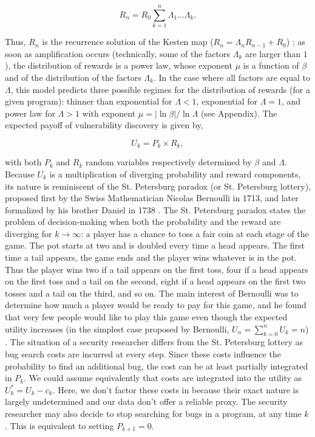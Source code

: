 \begin{equation}
R_{n} = R_{0} \sum_{k=1}^{n} \Lambda_1 ... \Lambda_k.
\end{equation}

Thus, $R_{n}$ is the recurrence solution of the  
Kesten map ($R_{n} = \Lambda_n R_{n-1} +R_0$)
\cite{kesten1973random,sornette1997convergent}:  as soon as amplification occurs (technically, 
some of the factors $\Lambda_k$ are larger than $1$), the distribution
of rewards is a power law, whose exponent $\mu$ is a function of $\beta$
and of the distribution of the factors $\Lambda_k$. In the case where
all factors are equal to $\Lambda$, this model predicts three possible regimes for the distribution of rewards (for a given program): thinner than exponential for $\Lambda < 1$, exponential for $\Lambda = 1$, and power law for $\Lambda > 1$ with exponent $\mu = |\ln \beta|/ \ln \Lambda$ (see Appendix). The expected payoff of vulnerability discovery is given by,

\begin{equation}
\label{ }
U_k = P_k \times R_k,
\end{equation}

\noindent with both $P_k$ and $R_k$ random variables respectively determined by $\beta$ and $\Lambda$. Because $U_k$ is a multiplication of diverging probability and reward components, its nature is reminiscent of the St. Petersburg paradox (or St. Petersburg lottery), proposed first by the Swiss Mathematician Nicolas Bernoulli in 1713, and later formalized by his brother Daniel in 1738 \cite{bernoulli1954exposition}.  The St. Petersburg paradox states the problem of decision-making when both the probability and the reward are diverging  for $k \rightarrow \infty$: a player has a chance to toss a fair coin at each stage of the game. The pot starts at two and is doubled every time a head appears. The first time a tail appears, the game ends and the player wins whatever is in the pot. Thus the player wins two if a tail appears on the first toss, four if a head appears on the first toss and a tail on the second, eight if a head appears on the first two tosses and a tail on the third, and so on. The main interest of Bernoulli was to determine how much a player would be ready to pay for this game, and he found that very few people would like to play this game even though the expected utility increases (in the simplest case proposed by Bernoulli, $U_n = \sum_{k=0}^{n} U_k = n$) \cite{bernoulli1954exposition}. The situation of a security researcher differs from the St. Petersburg lottery as bug search costs are incurred at every step. Since these costs influence the probability to find an additional bug, the cost can be at least partially integrated in $P_k$. We could assume equivalently that costs are integrated into the utility as $U^{*}_k = U_k - c_k$. Here, we don't factor these costs in because their exact nature is largely undetermined and our data don't offer a reliable proxy. The security researcher may also decide to stop searching for bugs in a program, at any time $k$. This is equivalent to setting $P_{k+1} = 0$.\\

